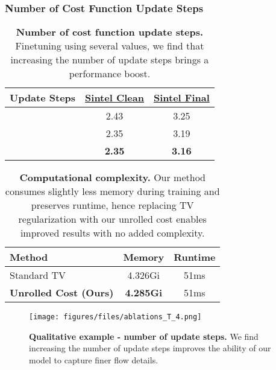 \documentclass[10pt,twocolumn,letterpaper]{article}
\begin{document}
\subsubsection{Number of Cost Function Update Steps}
\begin{table}
\begin{center}
\begin{tabular}{l c c} 
    \toprule
    \textbf{ Update Steps} & \textbf{\underline{Sintel Clean}} & \textbf{\underline{Sintel Final}} \\
    \midrule
                   & 2.43   & 3.25 \\
                   & 2.35   & 3.19 \\
          & \textbf{2.35}   & \textbf{3.16} \\
    \bottomrule
\end{tabular}
\end{center}
\caption{\textbf{Number of cost function update steps.} 
    Finetuning using several  values, we find that increasing the number of update steps brings a performance boost.
}
\label{ta:admm_iters}
\end{table} \begin{table}
\begin{center}
\begin{tabular}{l c c} 
    \toprule
    \textbf{Method} & \textbf{Memory} & \textbf{Runtime} \\
    \midrule
    Standard TV                 & 4.326Gi   & 51ms \\
    \textbf{Unrolled Cost (Ours)}      & \textbf{4.285Gi}   & 51ms \\
    \bottomrule
\end{tabular}
\end{center}
\caption{\textbf{Computational complexity.} 
    Our method consumes slightly less memory during training and preserves runtime, hence 
    replacing TV regularization with our unrolled cost enables improved results with no added complexity.
}
\label{ta:comp}
\end{table} \begin{figure}
\begin{center}
\texttt{[image: figures/files/ablations\_T\_4.png]}
\end{center}
   \caption{\textbf{Qualitative example - number of update steps.}
   We find increasing the number of update steps improves the ability of our model to capture finer flow details.}
\label{fig:ab_T}
\end{figure}
 
\end{document}
